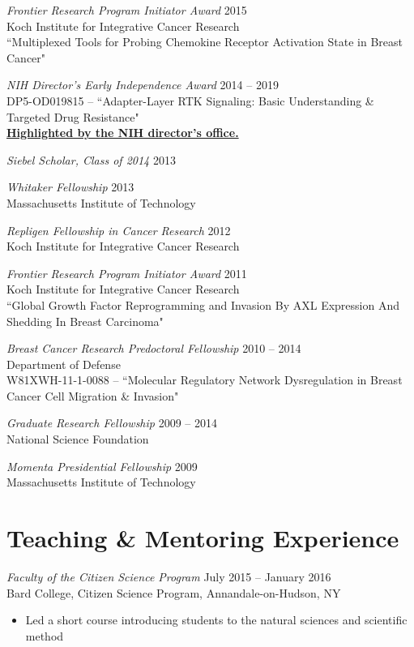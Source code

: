 \documentclass[11pt]{res}
\begin{document}
\begin{resume}
{\sl Frontier Research Program Initiator Award} \hfill 2015 \\
Koch Institute for Integrative Cancer Research\\
``Multiplexed Tools for Probing Chemokine Receptor Activation State in Breast Cancer"

{\sl NIH Director's Early Independence Award}  \hfill 2014 -- 2019 \\
DP5-OD019815 -- ``Adapter-Layer RTK Signaling: Basic Understanding \& Targeted Drug Resistance" \\
{\bf \href{https://directorsblog.nih.gov/2014/10/28/creative-minds-tackling-chemotherapy-resistance/}{Highlighted by the NIH director's office.}}

{\sl Siebel Scholar, Class of 2014} \hfill 2013 

{\sl Whitaker Fellowship}  \hfill 2013\\
Massachusetts Institute of Technology

{\sl Repligen Fellowship in Cancer Research} \hfill 2012 \\
Koch Institute for Integrative Cancer Research 

{\sl Frontier Research Program Initiator Award} \hfill 2011 \\
Koch Institute for Integrative Cancer Research\\
``Global Growth Factor Reprogramming and Invasion By AXL Expression And Shedding In Breast Carcinoma"

{\sl Breast Cancer Research Predoctoral Fellowship} \hfill 2010 -- 2014 \\
Department of Defense\\
W81XWH-11-1-0088 -- ``Molecular Regulatory Network Dysregulation in Breast Cancer Cell Migration \& Invasion"

{\sl Graduate Research Fellowship}  \hfill 2009 -- 2014 \\
National Science Foundation

{\sl Momenta Presidential Fellowship} \hfill 2009 \\
Massachusetts Institute of Technology



\section{Teaching \& Mentoring Experience}

{\sl Faculty of the Citizen Science Program} \hfill July 2015 -- January 2016 \\
Bard College, Citizen Science Program, Annandale-on-Hudson, NY	
\begin{itemize}
\item Led a short course introducing students to the natural sciences and scientific method
\end{itemize}


\end{resume}
\end{document}
